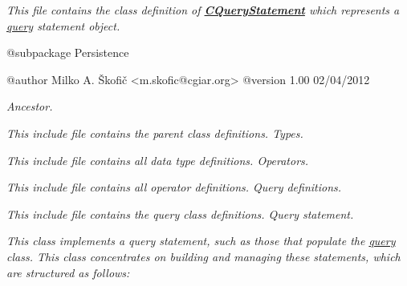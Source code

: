 {\itshape This file contains the class definition of {\bfseries \hyperlink{class_c_query_statement}{C\-Query\-Statement}} which represents a \hyperlink{class_c_query}{query} statement object.}

{\itshape \begin{DoxyVerb} @subpackage        Persistence

 @author            Milko A. Škofič <m.skofic@cgiar.org>
 @version   1.00 02/04/2012\end{DoxyVerb}
}

{\itshape Ancestor.}

{\itshape This include file contains the parent class definitions. Types.}

{\itshape This include file contains all data type definitions. Operators.}

{\itshape This include file contains all operator definitions. Query definitions.}

{\itshape This include file contains the query class definitions. Query statement.}

{\itshape This class implements a query statement, such as those that populate the \hyperlink{class_c_query}{query} class. This class concentrates on building and managing these statements, which are structured as follows\-:}

